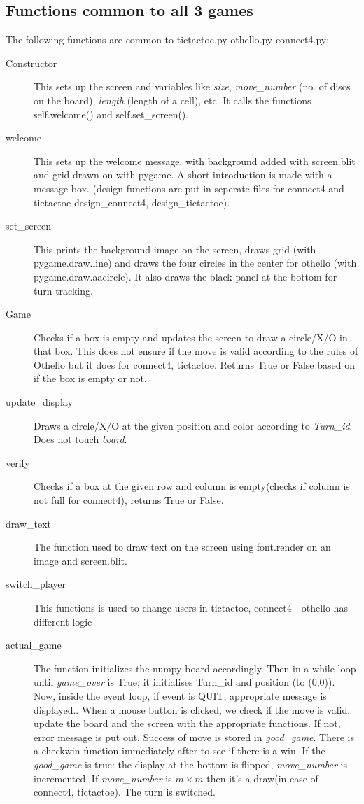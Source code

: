 \documentclass[12pt]{article}
\begin{document}
\subsection {Functions common to all 3 games}
The following functions are common to tictactoe.py othello.py connect4.py:
\begin{description}
    \item[Constructor] This sets up the screen and variables like \textit{size}, \textit{move\_number} (no. of discs on the board), \textit{length} (length of a cell), etc. It calls the functions self.welcome() and self.set\_screen(). 
    \item[welcome] This sets up the welcome message, with background added with screen.blit and grid drawn on with pygame. A short introduction is made with a message box. (design functions are put in seperate files for connect4 and tictactoe design\_connect4, design\_tictactoe).
    \item[set\_screen] This prints the background image on the screen, draws grid (with pygame.draw.line) and draws the four circles in the center for othello (with pygame.draw.aacircle). It also draws the black panel at the bottom for turn tracking.
    \item[Game] Checks if a box is empty and updates the screen to draw a circle/X/O in that box. This does not ensure if the move is valid according to the rules of Othello but it does for connect4, tictactoe. Returns True or False based on if the box is empty or not. 
    \item[update\_display] Draws a circle/X/O at the given position and color according to \textit{Turn\_id}. Does not touch \textit{board}.
    \item[verify] Checks if a box at the given row and column is empty(checks if column is not full for connect4), returns True or False.
    \item[draw\_text] The function used to draw text on the screen using font.render on an image and screen.blit.
    \item[switch\_player] This functions is used to change users in tictactoe, connect4 -  othello has different logic
    \item[actual\_game] The function initializes the numpy board accordingly. Then in a while loop until \textit{game\_over} is True; it initialises Turn\_id and position (to (0,0)). 
    Now, inside the event loop, if event is QUIT, appropriate message is displayed.. When a mouse button is clicked, we check if the move is valid, update the board and the screen with the appropriate functions. If not, error message is put out. Success of move is stored in \textit{good\_game}. There is a checkwin function immediately after to see if there is a win.  
    If the \textit{good\_game} is true: the display at the bottom is flipped, \textit{move\_number} is incremented. If \textit{move\_number} is $m \times m$ then it's a draw(in case of connect4, tictactoe). The turn is switched.  
     
\end{description}
\end{document}
